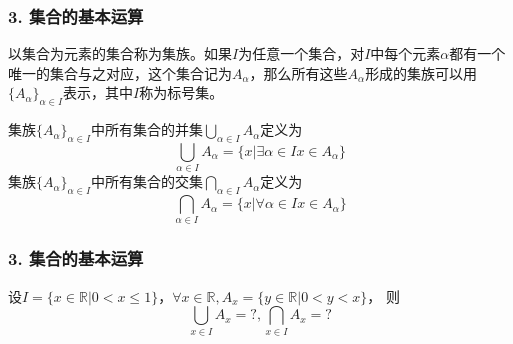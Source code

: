 \documentclass{beamer}
\begin{document}
\begin{CJK*}{UTF8}{gbsn}

\begin{frame}
  \frametitle{3. 集合的基本运算}
  \begin{Def}  \justifying\let\raggedright\justifying
    以集合为元素的集合称为\alert{集族}。如果$I$为任意一个集合，对$I$中每个元素$\alpha$都有一个唯一的集合与之对应，这个集合记为$A_{\alpha}$，那么所有这些$A_{\alpha}$形成的集族可以用$\{A_{\alpha}\}_{\alpha \in I}$表示，其中$I$称为\alert{标号集}。
  \end{Def}
  \begin{Def}
    集族$\{A_{\alpha}\}_{\alpha \in I}$中所有集合的并集$\bigcup_{\alpha \in I}A_{\alpha}$定义为
\[ \bigcup_{\alpha \in I}A_{\alpha} = \{x|\exists \alpha \in I  x \in A_{\alpha}\}\]
    集族$\{A_{\alpha}\}_{\alpha \in I}$中所有集合的交集$\bigcap_{\alpha \in I}A_{\alpha}$定义为
\[ \bigcap_{\alpha \in I}A_{\alpha} = \{x|\forall \alpha \in I x \in A_{\alpha}\}\]
  \end{Def}
\end{frame}

\begin{frame}
  \frametitle{3. 集合的基本运算}
  \begin{Ex}
    设$I=\{x \in \mathbb{R} | 0 < x \leq 1\}$，$\forall x \in \mathbb{R}, A_x=\{y\in \mathbb{R}|0 < y < x\}$，
    则
    \begin{equation*}
      \bigcup_{x\in I}A_x=?,
      \bigcap_{x\in I}A_x=?      
    \end{equation*}
  \end{Ex}
\end{frame}


\end{CJK*}
\end{document}
